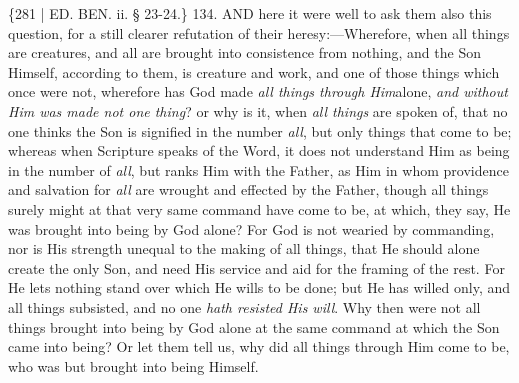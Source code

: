 \{281 | ED.
BEN.
ii. § 23-24.\} 134. AND here it were well to ask
them also this question, for a still clearer refutation of their
heresy:—Wherefore, when all things are creatures, and all are
brought into consistence from nothing, and the Son Himself, according
to them, is creature and work, and one of those things which once were
not, wherefore has God made \emph{all things through Him}alone, \emph{and
without Him was made not one thing}? or why is it, when \emph{all
things} are spoken of, that no one thinks the Son is signified in
the number \emph{all}, but only things that come to be; whereas when
Scripture speaks of the Word, it does not understand Him as being in
the number of \emph{all}, but ranks Him with the Father, as Him in
whom providence and salvation for \emph{all} are wrought and effected
by the Father, though all things surely might at that very same
command have come to be, at which, they say, He was brought into being
by God alone? For God is not wearied by commanding, nor is His
strength unequal to the making of all things, that He should alone
create the only Son, and need His service and aid for the framing of
the rest. For He lets nothing stand over which He wills to be done;
but He has willed only, and all things subsisted, and no one \emph{hath
resisted His will}. Why then were not all things brought into being
by God alone at the same command at which the Son came into being? Or
let them tell us, why did all things through Him come to be, who was
but brought into being Himself.

